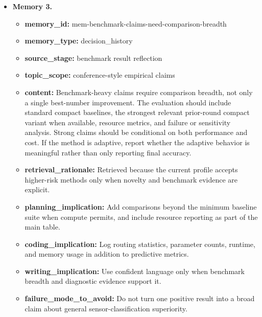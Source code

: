 \documentclass{opendatalab}
\begin{document}
\begin{tcolorbox}
\begin{itemize}
  \item \textbf{Memory 3.}
  \begin{itemize}\setlength\itemsep{1pt}
    \item \textbf{memory\_id:} mem-benchmark-claims-need-comparison-breadth
    \item \textbf{memory\_type:} decision\_history
    \item \textbf{source\_stage:} benchmark result reflection
    \item \textbf{topic\_scope:} conference-style empirical claims
    \item \textbf{content:} Benchmark-heavy claims require comparison breadth, not only a single best-number improvement. The evaluation should include standard compact baselines, the strongest relevant prior-round compact variant when available, resource metrics, and failure or sensitivity analysis. Strong claims should be conditional on both performance and cost. If the method is adaptive, report whether the adaptive behavior is meaningful rather than only reporting final accuracy.
    \item \textbf{retrieval\_rationale:} Retrieved because the current profile accepts higher-risk methods only when novelty and benchmark evidence are explicit.
    \item \textbf{planning\_implication:} Add comparisons beyond the minimum baseline suite when compute permits, and include resource reporting as part of the main table.
    \item \textbf{coding\_implication:} Log routing statistics, parameter counts, runtime, and memory usage in addition to predictive metrics.
    \item \textbf{writing\_implication:} Use confident language only when benchmark breadth and diagnostic evidence support it.
    \item \textbf{failure\_mode\_to\_avoid:} Do not turn one positive result into a broad claim about general sensor-classification superiority.
  \end{itemize}
\end{itemize}


\end{tcolorbox}
\end{document}
